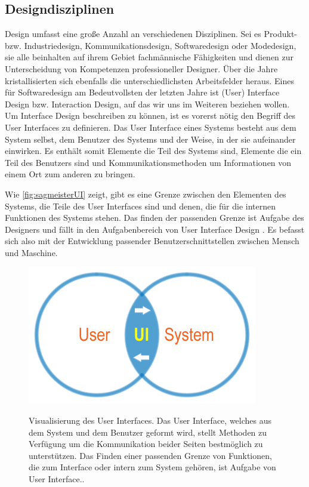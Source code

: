 \subsection{Designdisziplinen}
Design umfasst eine große Anzahl an verschiedenen Disziplinen. Sei es Produkt- bzw. Industriedesign, Kommunikationsdesign, Softwaredesign oder Modedesign, sie alle beinhalten auf ihrem Gebiet fachmännische Fähigkeiten und dienen zur Unterscheidung von Kompetenzen professioneller Designer. Über die Jahre kristallisierten sich ebenfalls die unterschiedlichsten Arbeitsfelder heraus. Eines für Softwaredesign am Bedeutvollsten der letzten Jahre ist (User) Interface Design bzw. Interaction Design, auf das wir uns im Weiteren beziehen wollen.\\
Um Interface Design beschreiben zu können, ist es vorerst nötig den Begriff des User Interfaces zu definieren. Das User Interface eines Systems besteht aus dem System selbst, dem Benutzer des Systems und der Weise, in der sie aufeinander einwirken. Es enthält somit Elemente die Teil des Systems sind, Elemente die ein Teil des Benutzers sind und Kommunikationsmethoden um Informationen von einem Ort zum anderen zu bringen.

\medskip Wie \autoref{fig:sagmeisterUI} zeigt, gibt es eine Grenze zwischen den Elementen des Systems, die Teile des User Interfaces sind und	denen, die für	die	internen Funktionen des Systems stehen. Das finden der passenden Grenze ist Aufgabe des	Designers und fällt	in den Aufgabenbereich	von	User Interface Design \citep{Barfield:1993}. Es befasst sich also mit der Entwicklung passender Benutzerschnittstellen zwischen Mensch und Maschine.

\begin{figure}
	\begin{center}
        {\includegraphics[width=.7\linewidth]{gfx/sagmeisterUI}}
	\end{center}
		\caption[Visualisierung des User Interfaces \newline \citep{Sagmeister:2008}]{Visualisierung des User Interfaces. Das User Interface, welches aus dem System und dem Benutzer geformt wird, stellt Methoden zu Verfügung um die Kommunikation beider Seiten bestmöglich zu unterstützen. Das Finden einer passenden Grenze von Funktionen, die zum Interface oder intern zum System gehören, ist Aufgabe von User Interface..}\label{fig:sagmeisterUI}
\end{figure}

